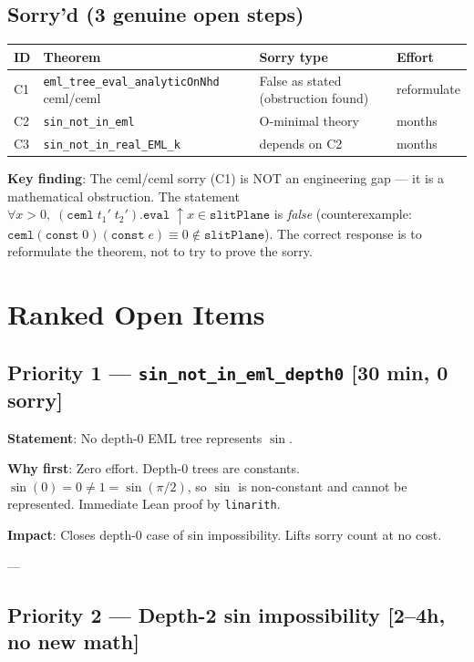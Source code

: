 \documentclass[12pt]{article}
\theoremstyle{definition}
\begin{document}
\subsection{Sorry'd (3 genuine open steps)}

\begin{center}
\begin{tabular}{llll}
\toprule
ID & Theorem & Sorry type & Effort \\
\midrule
C1 & \texttt{eml\_tree\_eval\_analyticOnNhd} ceml/ceml & False as stated (obstruction found) & reformulate \\
C2 & \texttt{sin\_not\_in\_eml} & O-minimal theory & months \\
C3 & \texttt{sin\_not\_in\_real\_EML\_k} & depends on C2 & months \\
\bottomrule
\end{tabular}
\end{center}

\textbf{Key finding}: The ceml/ceml sorry (C1) is NOT an engineering gap — it is a mathematical
obstruction. The statement $\forall x > 0,\; (\texttt{ceml}\;t_1'\;t_2').\texttt{eval}\;\uparrow x
\in \texttt{slitPlane}$ is \emph{false} (counterexample:
$\texttt{ceml}(\texttt{const}\;0)(\texttt{const}\;e) \equiv 0 \notin \texttt{slitPlane}$).
The correct response is to reformulate the theorem, not to try to prove the sorry.

\section{Ranked Open Items}

\subsection{\textcolor{high}{Priority 1 — \texttt{sin\_not\_in\_eml\_depth0} [30 min, 0 sorry]}}

\textbf{Statement}: No depth-0 EML tree represents $\sin$.

\textbf{Why first}: Zero effort. Depth-0 trees are constants. $\sin(0) = 0 \neq 1 = \sin(\pi/2)$,
so $\sin$ is non-constant and cannot be represented. Immediate Lean proof by \texttt{linarith}.

\textbf{Impact}: Closes depth-0 case of sin impossibility. Lifts sorry count at no cost.

---

\subsection{\textcolor{high}{Priority 2 — Depth-2 sin impossibility [2–4h, no new math]}}
\end{document}
